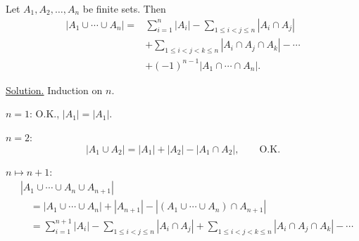 \noindent Let $A_1,A_2,\ldots,A_n$ be finite sets. Then
\[
\begin{aligned}
 \bigl|A_1\cup\cdots\cup A_n\bigr|
 ={}&\sum_{i=1}^{n}|A_i|
 -\sum_{1\leq i<j\leq n}|A_i\cap A_j|\\
 &+\sum_{1\leq i<j<k\leq n}|A_i\cap A_j\cap A_k|
 -\cdots\\
 &+(-1)^{n-1}|A_1\cap\cdots\cap A_n|.
\end{aligned}
\]

\noindent\underline{Solution.} Induction on $n$.

\noindent $n=1$: O.K., $|A_1|=|A_1|$.

\noindent $n=2$:
\[
 |A_1\cup A_2|=|A_1|+|A_2|-|A_1\cap A_2|,
 \qquad\text{O.K.}
\]

\noindent $n\longmapsto n+1$:
\[
\begin{aligned}
 &|A_1\cup\cdots\cup A_n\cup A_{n+1}|\\
 &\quad=|A_1\cup\cdots\cup A_n|+|A_{n+1}|
 -|(A_1\cup\cdots\cup A_n)\cap A_{n+1}|\\
 &\quad=\sum_{i=1}^{n+1}|A_i|
 -\sum_{1\leq i<j\leq n}|A_i\cap A_j|
 +\sum_{1\leq i<j<k\leq n}|A_i\cap A_j\cap A_k|
 -\cdots
\end{aligned}
\]
